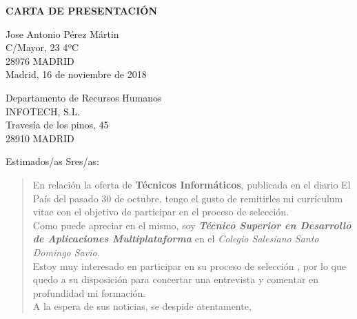 \documentclass[10pt,a4paper]{letter}
\begin{document}
\begin{center}
{\LARGE \bf CARTA DE PRESENTACIÓN}
\vspace{1cm} \\
\end{center}
\begin{flushright}
Jose Antonio Pérez Mártin \\
C/Mayor, 23 4ºC \\
28976 MADRID
\vspace{0,5cm} \\
Madrid, 16 de noviembre de 2018
\end{flushright}
\vspace{0,0cm} 
\begin{flushleft}
Departamento de Recursos Humanos \\
INFOTECH, S.L. \\
Travesía de los pinos, 45 \\
28910 MADRID \\
\end{flushleft}
\vspace{2cm}
\begin{flushleft}
Estimados/as Sres/as:
\end{flushleft}
\begin{quote}
En relación la oferta de {\bf Técnicos Informáticos}, publicada en el diario El País del pasado 30 de octubre, tengo el gusto de remitirles mi currículum vitae con el objetivo de participar en el proceso de selección.
\vspace{0,5cm} \\
Como puede apreciar en el mismo, soy {\bf \em Técnico Superior en Desarrollo de Aplicaciones Multiplataforma} en el {\em Colegio Salesiano Santo Domingo Savio.}
\vspace{0,5cm} \\
Estoy muy interesado en participar en su proceso de selección , por lo que quedo a su disposición para concertar una entrevista y comentar en profundidad mi formación.
\vspace{0,5cm} \\
A la espera de sus noticias, se despide atentamente,
\end{quote}
\end{document}
